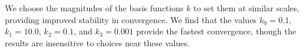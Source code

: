 \documentclass[modern]{aastex62}
\begin{document}
We choose the magnitudes of the basis functions $k$ to set them at similar scales, providing improved stability in convergence.
We find that the values $k_0=0.1$, $k_1=10.0$, $k_2=0.1$, and $k_3=0.001$ provide the fastest convergence, though the results are insensitive to choices near these values.


% 
%

\end{document}
